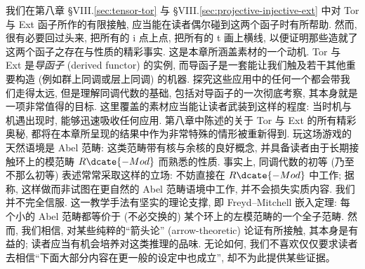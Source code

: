 我们在第八章 §VIII.\ref{sec:tensor-tor} 与 §VIII.\ref{sec:projective-injective-ext} 中对 Tor 与 Ext 函子所作的有限接触, 应当能在读者偶尔碰到这两个函子时有所帮助. 然而, 很有必要回过头来, 把所有的 i 点上点, 把所有的 t 画上横线, 以便证明那些造就了这两个函子之存在与性质的精彩事实.
这是本章所涵盖素材的一个动机. Tor 与 Ext 是\emph{导函子} (derived functor) 的实例, 而导函子是一套能让我们触及若干其他重要构造 (例如群上同调或层上同调) 的机器. 探究这些应用中的任何一个都会带我们走得太远, 但是理解同调代数的基础, 包括对导函子的一次彻底考察, 其本身就是一项非常值得的目标. 这里覆盖的素材应当能让读者武装到这样的程度: 当时机与机遇出现时, 能够迅速吸收任何应用. 第八章中陈述的关于 Tor 与 Ext 的所有精彩奥秘, 都将在本章所呈现的结果中作为非常特殊的情形被重新得到.
玩这场游戏的天然语境是 Abel 范畴: 这类范畴带有核与余核的良好概念, 并具备读者由于长期接触环上的模范畴 $R\dcate{-Mod}$ 而熟悉的性质. 事实上, 同调代数的初等 (乃至不那么初等) 表述常常采取这样的立场: 不妨直接在 $R\dcate{-Mod}$ 中工作; 据称, 这样做而非试图在更自然的 Abel 范畴语境中工作, 并不会损失实质内容.
我们并不完全信服. 这一教学手法有坚实的理论支撑, 即 Freyd–Mitchell 嵌入定理: 每个小的 Abel 范畴都等价于 (不必交换的) 某个环上的左模范畴的一个全子范畴. 然而, 我们相信, 对某些纯粹的``箭头论'' (arrow-theoretic) 论证有所接触, 其本身是有益的; 读者应当有机会培养对这类推理的品味. 无论如何, 我们不喜欢仅仅要求读者去相信``下面大部分内容在更一般的设定中也成立'', 却不为此提供某些证据。

